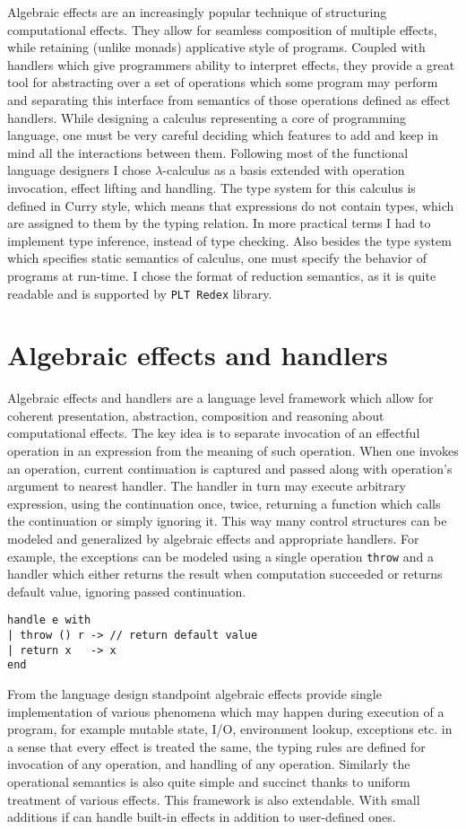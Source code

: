 \documentclass[inz, english, shortabstract]{iithesis}
\newcommand{\Redex}{\texttt{PLT Redex} }
\newcommand{\LC}{\(\lambda\)-calculus }
\begin{document}
Algebraic effects \cite{Plotkin2003} are an increasingly popular technique of structuring computational effects.
They allow for seamless composition of multiple effects, while retaining (unlike monads) applicative style of programs.
Coupled with handlers \cite{Plotkin2013} which give programmers ability to interpret effects, they provide a great tool for abstracting over a set of operations which some program may perform and separating this interface from semantics of those operations defined as effect handlers.
While designing a calculus representing a core of programming language, one must be very careful deciding which features to add and keep in mind all the interactions between them.
Following most of the functional language designers I chose \LC as a basis extended with operation invocation, effect lifting and handling.
The type system for this calculus is defined in Curry style, which means that expressions do not contain types, which are assigned to them by the typing relation.
In more practical terms I had to implement type inference, instead of type checking.
Also besides the type system which specifies static semantics of calculus, one must specify the behavior of programs at run-time.
I chose the format of reduction semantics, as it is quite readable and is supported by \Redex library.

\section{Algebraic effects and handlers}
Algebraic effects and handlers are a language level framework which allow for coherent presentation, abstraction, composition and reasoning about computational effects.
The key idea is to separate invocation of an effectful operation in an expression from the meaning of such operation.
When one invokes an operation, current continuation is captured and passed along with operation's argument to nearest handler.
The handler in turn may execute arbitrary expression, using the continuation once, twice, returning a function which calls the continuation or simply ignoring it.
This way many control structures can be modeled and generalized by algebraic effects and appropriate handlers.
For example, the exceptions can be modeled using a single operation \texttt{throw} and a handler which either returns the result when computation succeeded or returns default value, ignoring passed continuation.
\begin{verbatim}
handle e with
| throw () r -> // return default value
| return x   -> x
end
\end{verbatim}
From the language design standpoint algebraic effects provide single implementation of various phenomena which may happen during execution of a program, for example mutable state, I/O, environment lookup, exceptions etc. in a sense that every effect is treated the same, the typing rules are defined for invocation of any operation, and handling of any operation.
Similarly the operational semantics is also quite simple and succinct thanks to uniform treatment of various effects.
This framework is also extendable. With small additions if can handle built-in effects in addition to user-defined ones.
\end{document}
